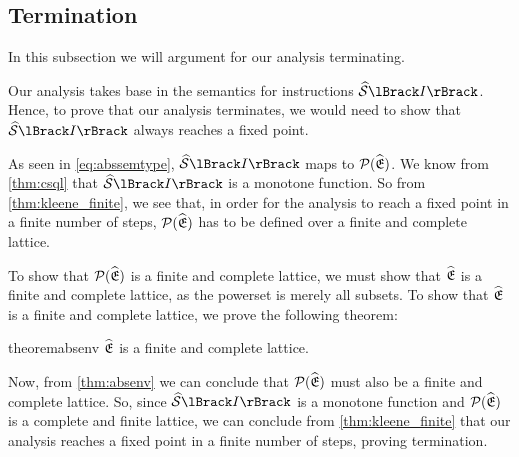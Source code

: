 \subsection{Termination}\label{subsec:termination}

In this subsection we will argument for our analysis terminating.

Our analysis takes base in the semantics for instructions $\abssem{I}$.
Hence, to prove that our analysis terminates, we would need to show that $\abssem{I}$ always reaches a fixed point.

As seen in \autoref{eq:abssemtype}, $\abssem{I}$ maps to $\mathcal{P}(\widehat{\mathfrak{E}})$.
We know from \autoref{thm:csql} that $\abssem{I}$ is a monotone function.
So from \autoref{thm:kleene_finite}, we see that, in order for the analysis to reach a fixed point in a finite number of steps, $\mathcal{P}(\widehat{\mathfrak{E}})$ has to be defined over a finite and complete lattice.

To show that $\mathcal{P}(\widehat{\mathfrak{E}})$ is a finite and complete lattice, we must show that $\widehat{\mathfrak{E}}$ is a finite and complete lattice, as the powerset is merely all subsets.
To show that $\widehat{\mathfrak{E}}$ is a finite and complete lattice, we prove the following theorem:

\begin{restatable}{theorem}{absenv}\label{thm:absenv}
$\widehat{\mathfrak{E}}$ is a finite and complete lattice.
\end{restatable}

Now, from \autoref{thm:absenv} we can conclude that $\mathcal{P}(\widehat{\mathfrak{E}})$ must also be a finite and complete lattice.
So, since $\abssem{I}$ is a monotone function and $\mathcal{P}(\widehat{\mathfrak{E}})$ is a complete and finite lattice, we can conclude from \autoref{thm:kleene_finite} that our analysis reaches a fixed point in a finite number of steps, proving termination.